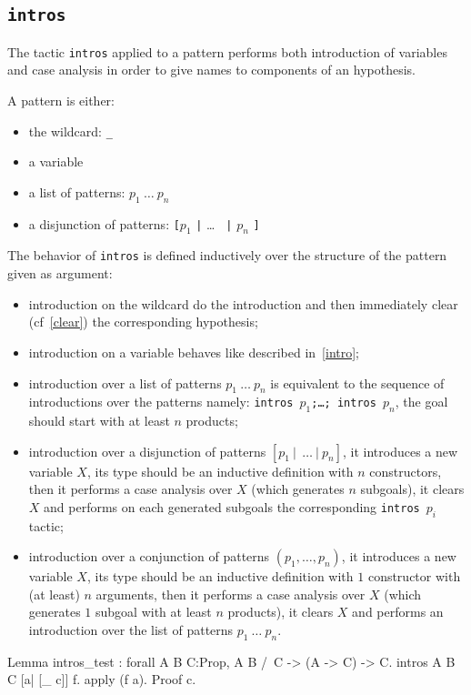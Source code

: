 \subsection{\tt intros \pattern}\label{intros-pattern}

The tactic {\tt intros} applied to a pattern performs both
introduction of variables and case analysis in order to give names to
components of an hypothesis.

A pattern is either:
\begin{itemize}
\item the wildcard: {\tt \_}
\item a variable
\item a list of patterns: $p_1~\ldots~p_n$
\item a disjunction of patterns: {\tt [}$p_1$ {\tt |} {\ldots} {\tt
|} $p_n$ {\tt ]}
\end{itemize}

The behavior of \texttt{intros} is defined inductively over the
structure of the pattern given as argument:
\begin{itemize}
\item introduction on the wildcard do the introduction and then
  immediately clear (cf~\ref{clear}) the corresponding hypothesis;
\item introduction on a variable behaves like described in~\ref{intro}; 
\item introduction over a
list of patterns $p_1~\ldots~p_n$ is equivalent to the sequence of
introductions over the patterns namely:
\texttt{intros $p_1$;\ldots; intros $p_n$}, the goal should start with
at least $n$ products;
\item introduction over a
disjunction of patterns $[p_1~|~~\ldots~|~p_n]$, it 
introduces a new variable $X$, its type should be an inductive
definition with $n$
constructors, then it performs a case analysis over $X$ 
(which generates $n$ subgoals), it 
clears $X$ and performs on each generated subgoals the corresponding
\texttt{intros}~$p_i$ tactic;
\item introduction over a 
conjunction  of patterns $(p_1,\ldots,p_n)$, it
introduces a new variable $X$, its type should be an inductive 
definition with $1$
constructor with (at least) $n$ arguments, then it performs a case 
analysis over $X$ 
(which generates $1$ subgoal with at least $n$ products), it 
clears $X$ and performs an introduction over the list of patterns $p_1~\ldots~p_n$.
\end{itemize}
\begin{coq_example}
Lemma intros_test : forall A B C:Prop, A \/ B /\ C -> (A -> C) -> C.
intros A B C [a| [_ c]] f.
apply (f a).
Proof c.
\end{coq_example}

